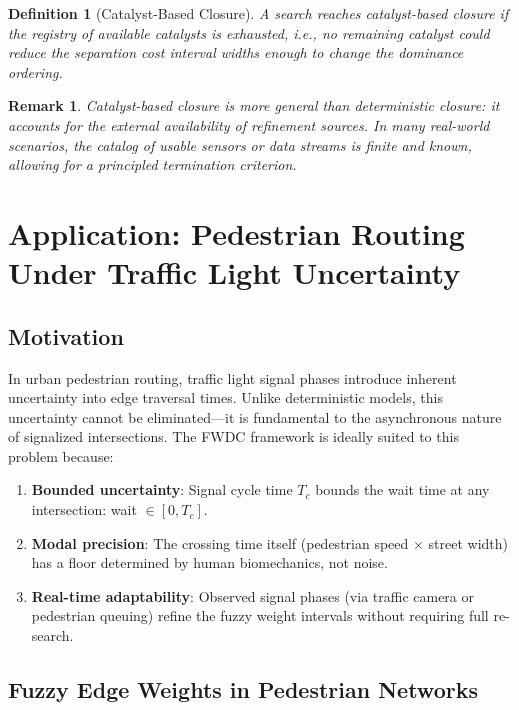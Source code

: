\documentclass[twocolumn,11pt,a4paper]{article}
\newtheorem{definition}[theorem]{Definition}
\newtheorem{remark}[theorem]{Remark}
\theoremstyle{definition}
\begin{document}
\begin{definition}[Catalyst-Based Closure]
\label{def:catalyst_closure}
A search reaches \emph{catalyst-based closure} if the registry of available catalysts is exhausted, i.e., no remaining catalyst could reduce the separation cost interval widths enough to change the dominance ordering.
\end{definition}

\begin{remark}
Catalyst-based closure is more general than deterministic closure: it accounts for the external availability of refinement sources. In many real-world scenarios, the catalog of usable sensors or data streams is finite and known, allowing for a principled termination criterion.
\end{remark}



\section{Application: Pedestrian Routing Under Traffic Light Uncertainty}

\subsection{Motivation}

In urban pedestrian routing, traffic light signal phases introduce inherent uncertainty into edge traversal times. Unlike deterministic models, this uncertainty cannot be eliminated---it is fundamental to the asynchronous nature of signalized intersections. The FWDC framework is ideally suited to this problem because:

\begin{enumerate}
\item \textbf{Bounded uncertainty}: Signal cycle time $T_c$ bounds the wait time at any intersection: wait $\in [0, T_c]$.
\item \textbf{Modal precision}: The crossing time itself (pedestrian speed $\times$ street width) has a floor determined by human biomechanics, not noise.
\item \textbf{Real-time adaptability}: Observed signal phases (via traffic camera or pedestrian queuing) refine the fuzzy weight intervals without requiring full re-search.
\end{enumerate}

\subsection{Fuzzy Edge Weights in Pedestrian Networks}
\end{document}
